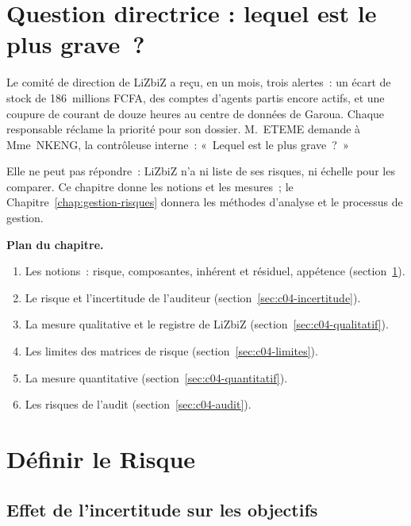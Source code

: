 \bigskip

\section*{Question directrice : lequel est le plus grave~?}

Le comité de direction de LiZbiZ a reçu, en un mois, trois alertes~: un écart
de stock de 186~millions FCFA, des comptes d'agents partis encore actifs,
et une coupure de courant de douze heures au centre de données de Garoua.
Chaque responsable réclame la priorité pour son dossier. M.~ETEME demande à
Mme~NKENG, la contrôleuse interne~: «~Lequel est le plus grave~?~»

Elle ne peut pas répondre~: LiZbiZ n'a ni liste de ses risques, ni échelle
pour les comparer. Ce chapitre donne les notions et les mesures~; le
Chapitre~\ref{chap:gestion-risques} donnera les méthodes d'analyse et le
processus de gestion.

\medskip
\textbf{Plan du chapitre.}
\begin{enumerate}
    \item Les notions~: risque, composantes, inhérent et résiduel,
          appétence (section~\ref{sec:c04-definir}).
    \item Le risque et l'incertitude de l'auditeur
          (section~\ref{sec:c04-incertitude}).
    \item La mesure qualitative et le registre de LiZbiZ
          (section~\ref{sec:c04-qualitatif}).
    \item Les limites des matrices de risque
          (section~\ref{sec:c04-limites}).
    \item La mesure quantitative (section~\ref{sec:c04-quantitatif}).
    \item Les risques de l'audit (section~\ref{sec:c04-audit}).
\end{enumerate}

\separateur

\section{Définir le Risque}
\label{sec:c04-definir}

\subsection{Effet de l'incertitude sur les objectifs}

